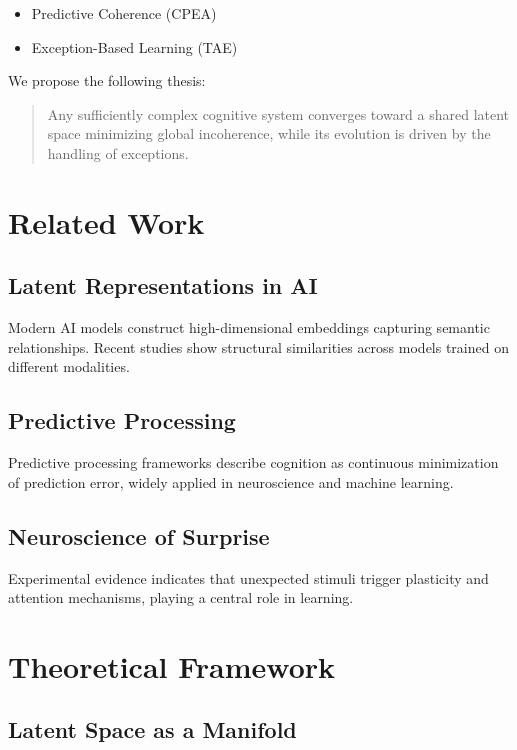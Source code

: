 \documentclass[11pt]{article}
\begin{document}
\begin{itemize}
    \item Predictive Coherence (CPEA)
    \item Exception-Based Learning (TAE)
\end{itemize}

We propose the following thesis:

\begin{quote}
Any sufficiently complex cognitive system converges toward a shared latent space minimizing global incoherence, while its evolution is driven by the handling of exceptions.
\end{quote}

\section{Related Work}

\subsection{Latent Representations in AI}

Modern AI models construct high-dimensional embeddings capturing semantic relationships. Recent studies show structural similarities across models trained on different modalities.

\subsection{Predictive Processing}

Predictive processing frameworks describe cognition as continuous minimization of prediction error, widely applied in neuroscience and machine learning.

\subsection{Neuroscience of Surprise}

Experimental evidence indicates that unexpected stimuli trigger plasticity and attention mechanisms, playing a central role in learning.

\section{Theoretical Framework}

\subsection{Latent Space as a Manifold}
\end{document}
